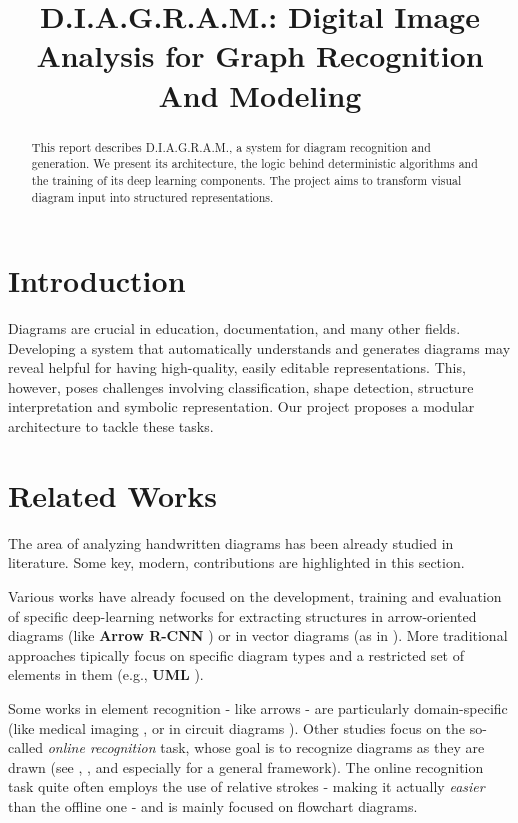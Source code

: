 \documentclass[conference]{IEEEtran}
\title{D.I.A.G.R.A.M.: Digital Image Analysis for Graph Recognition And Modeling}
\author{
    \IEEEauthorblockN{Filippo Garagnani, Saverio Napolitano, Nicola Ricciardi}
    \IEEEauthorblockA{
        'Computer Vision and Cognitive System' course \\
        \textit{Università di Modena e Reggio Emilia}
    }
}
\begin{document}
\maketitle

\begin{abstract}
This report describes D.I.A.G.R.A.M., a system for diagram recognition and generation. We present its architecture, the logic behind deterministic algorithms and the training of its deep learning components. The project aims to transform visual diagram input into structured representations.
\end{abstract}

\section{Introduction}
Diagrams are crucial in education, documentation, and many other fields. Developing a system that automatically understands and generates diagrams may reveal helpful for having high-quality, easily editable representations. This, however, poses challenges involving classification, shape detection, structure interpretation and symbolic representation. Our project proposes a modular architecture to tackle these tasks.

\section{Related Works}
The area of analyzing handwritten diagrams has been already studied in literature. Some key, modern, contributions are highlighted in this section.

Various works have already focused on the development, training and evaluation of specific deep-learning networks for extracting structures in arrow-oriented diagrams (like \textbf{Arrow R-CNN} \cite{arrowrcnn}) or in vector diagrams (as in \cite{sketchdiagram}). More traditional approaches tipically focus on specific diagram types and a restricted set of elements in them (e.g., \textbf{UML} \cite{interactiveUML}). 

Some works in element recognition - like arrows - are particularly domain-specific (like medical imaging \cite{med1}\cite{med2}, or in circuit diagrams \cite{2024modular}). Other studies focus on the so-called \textit{online recognition} task, whose goal is to recognize diagrams as they are drawn (see \cite{online1}, \cite{online2}, \cite{online3} and especially \cite{framework} for a general framework). The online recognition task quite often employs the use of relative strokes - making it actually \textit{easier} than the offline one - and is mainly focused on flowchart diagrams.
\end{document}
